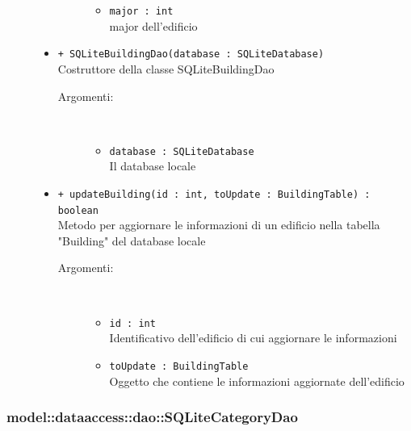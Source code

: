 \documentclass[../DefinizioneDiProdotto.tex]{subfiles}
\begin{document}
\begin{description}
\begin{itemize}
\begin{description}
\begin{itemize}
\item \texttt{major : int}\\
major dell'edificio\end{itemize}
\end{description}
\item \texttt{+ SQLiteBuildingDao(database : SQLiteDatabase)}\\
Costruttore della classe SQLiteBuildingDao
 \begin{description}
\item[Argomenti:] \
\begin{itemize}
\item \texttt{database : SQLiteDatabase}\\
Il database locale\end{itemize}
\end{description}
\item \texttt{+ updateBuilding(id : int, toUpdate : BuildingTable) : boolean}\\
Metodo per aggiornare le informazioni di un edificio nella tabella "Building" del database locale
 \begin{description}
\item[Argomenti:] \
\begin{itemize}
\item \texttt{id : int}\\
Identificativo dell'edificio di cui aggiornare le informazioni\item \texttt{toUpdate : BuildingTable}\\
Oggetto che contiene le informazioni aggiornate dell'edificio\end{itemize}
\end{description}
\end{itemize}
\end{description}

\subsubsection{model::dataaccess::dao::SQLiteCategoryDao}
\end{document}
